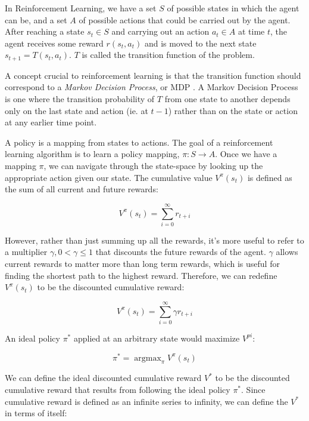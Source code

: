 \documentclass[12pt, letterpaper]{article}
\DeclareMathOperator*{\argmax}{argmax}
\begin{document}
In Reinforcement Learning, we have a set $S$ of possible states in which the agent can be, and a set $A$ of possible actions that could be carried out by the agent. After reaching a state $s_t \in S$ and carrying out an action $a_t \in A$ at time $t$, the agent receives some reward $r(s_t, a_t)$ and is moved to the next state $s_{t+1} = T(s_t, a_t)$. $T$ is called the transition function of the problem. 

A concept crucial to reinforcement learning is that the transition function should correspond to a \emph{Markov Decision Process}, or MDP \cite{tomMitchellML}. A Markov Decision Process is one where the transition probability of $T$ from one state to another depends only on the last state and action (ie. at $t-1$) rather than on the state or action at any earlier time point. 

A policy is a mapping from states to actions. The goal of a reinforcement learning algorithm is to learn a policy mapping, $\pi : S \rightarrow A$. Once we have a mapping $\pi$, we can navigate through the state-space by looking up the appropriate action given our state. The cumulative value $V^\pi(s_t)$ is defined as the sum of all current and future rewards:

\begin{equation}
    V^{\pi}(s_t) = \sum_{i=0}^\infty r_{t+i}
\end{equation}

However, rather than just summing up all the rewards, it's more useful to refer to a multiplier $\gamma, 0 < \gamma \le 1$ that discounts the future rewards of the agent. $\gamma$ allows current rewards to matter more than long term rewards, which is useful for finding the shortest path to the highest reward. Therefore, we can redefine $V^{\pi}(s_t)$ to be the discounted cumulative reward:

\begin{equation}
    V^{\pi}(s_t) = \sum_{i=0}^\infty \gamma r_{t+i}
\end{equation}

An ideal policy $\pi^*$ applied at an arbitrary state would maximize $V^{pi}$:

\begin{equation}
    \pi^* = \argmax_\pi V^{\pi}(s_t) 
\end{equation}

We can define the ideal discounted cumulative reward $V^*$ to be the discounted cumulative reward that results from following the ideal policy $\pi^*$. Since cumulative reward is defined as an infinite series to infinity, we can define the $V^*$ in terms of itself:
\end{document}
